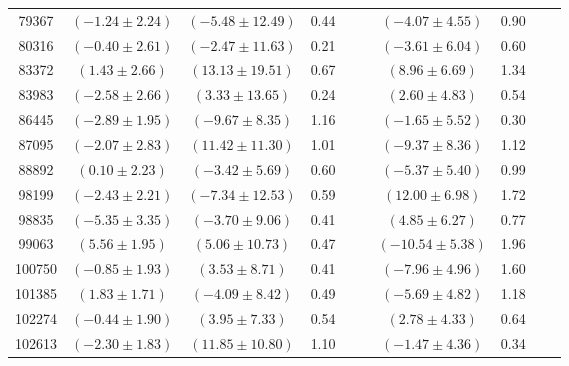 \documentclass [10pt, twoside] {uwthesis}[2012/04/02]
\begin{document}
{\begin{longtable}[t]{|c|c|cccc|cccc|}
79367	&  $(	-1.24	  \pm  	2.24	)$  &  $(	-5.48	  \pm  	12.49	)$  &  	0.44	  &  		  &  		  &  $(	-4.07	  \pm  	4.55	)$  &  	0.90	  &  		  &  		  \\
80316	&  $(	-0.40	  \pm  	2.61	)$  &  $(	-2.47	  \pm  	11.63	)$  &  	0.21	  &  		  &  		  &  $(	-3.61	  \pm  	6.04	)$  &  	0.60	  &  		  &  		  \\
83372	&  $(	1.43	  \pm  	2.66	)$  &  $(	13.13	  \pm  	19.51	)$  &  	0.67	  &  		  &  		  &  $(	8.96	  \pm  	6.69	)$  &  	1.34	  &  		  &  		  \\
83983	&  $(	-2.58	  \pm  	2.66	)$  &  $(	3.33	  \pm  	13.65	)$  &  	0.24	  &  		  &  		  &  $(	2.60	  \pm  	4.83	)$  &  	0.54	  &  		  &  		  \\
86445	&  $(	-2.89	  \pm  	1.95	)$  &  $(	-9.67	  \pm  	8.35	)$  &  	1.16	  &  		  &  		  &  $(	-1.65	  \pm  	5.52	)$  &  	0.30	  &  		  &  		  \\
87095	&  $(	-2.07	  \pm  	2.83	)$  &  $(	11.42	  \pm  	11.30	)$  &  	1.01	  &  		  &  		  &  $(	-9.37	  \pm  	8.36	)$  &  	1.12	  &  		  &  		  \\
88892	&  $(	0.10	  \pm  	2.23	)$  &  $(	-3.42	  \pm  	5.69	)$  &  	0.60	  &  		  &  		  &  $(	-5.37	  \pm  	5.40	)$  &  	0.99	  &  		  &  		  \\
98199	&  $(	-2.43	  \pm  	2.21	)$  &  $(	-7.34	  \pm  	12.53	)$  &  	0.59	  &  		  &  		  &  $(	12.00	  \pm  	6.98	)$  &  	1.72	  &  		  &  		  \\
98835	&  $(	-5.35	  \pm  	3.35	)$  &  $(	-3.70	  \pm  	9.06	)$  &  	0.41	  &  		  &  		  &  $(	4.85	  \pm  	6.27	)$  &  	0.77	  &  		  &  		  \\
99063	&  $(	5.56	  \pm  	1.95	)$  &  $(	5.06	  \pm  	10.73	)$  &  	0.47	  &  		  &  		  &  $(	-10.54	  \pm  	5.38	)$  &  	1.96	  &  		  &  		  \\
100750	&  $(	-0.85	  \pm  	1.93	)$  &  $(	3.53	  \pm  	8.71	)$  &  	0.41	  &  		  &  		  &  $(	-7.96	  \pm  	4.96	)$  &  	1.60	  &  		  &  		  \\
101385	&  $(	1.83	  \pm  	1.71	)$  &  $(	-4.09	  \pm  	8.42	)$  &  	0.49	  &  		  &  		  &  $(	-5.69	  \pm  	4.82	)$  &  	1.18	  &  		  &  		  \\
102274	&  $(	-0.44	  \pm  	1.90	)$  &  $(	3.95	  \pm  	7.33	)$  &  	0.54	  &  		  &  		  &  $(	2.78	  \pm  	4.33	)$  &  	0.64	  &  		  &  		  \\
102613	&  $(	-2.30	  \pm  	1.83	)$  &  $(	11.85	  \pm  	10.80	)$  &  	1.10	  &  		  &  		  &  $(	-1.47	  \pm  	4.36	)$  &  	0.34	  &  		  &  		  \\

\end{longtable}}
\end{document}
